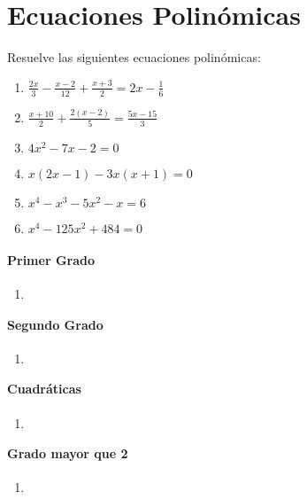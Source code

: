 \section{Ecuaciones Polinómicas}

\Exercicio Resuelve las siguientes ecuaciones polinómicas:
\begin{enumerate}[topsep=0pt]
	\item $\frac{2x}{3} - \frac{x-2}{12} + \frac{x+3}{2} = 2x - \frac{1}{6}$
	\item $\frac{x+10}{2} + \frac{2(x-2)}{5} = \frac{5x-15}{3}$
	\item $4x^2-7x -2 = 0$
	\item $x(2x-1) -3x(x+1) = 0$
	\item $x^4-x^3-5x^2-x= 6$
	\item $x^4- 125x^2 + 484 = 0$
\end{enumerate}

\paragraph{Primer Grado}
\begin{enumerate}[topsep=0pt]
	\item $ $
\end{enumerate}

\paragraph{Segundo Grado}
\begin{enumerate}[topsep=0pt]
	\item $ $
\end{enumerate}

\paragraph{Cuadráticas}
\begin{enumerate}[topsep=0pt]
	\item $ $
\end{enumerate}


\paragraph{Grado mayor que 2}
\begin{enumerate}[topsep=0pt]
	\item $ $
\end{enumerate}

